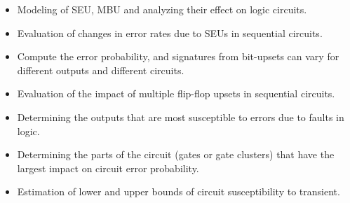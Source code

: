 \begin{itemize}
\item Modeling of SEU, MBU and analyzing their effect on logic circuits.
\item Evaluation of changes in error rates due to SEUs in sequential circuits.
\item Compute the error probability, and signatures from bit-upsets can vary for different outputs and different circuits. 
\item Evaluation of the impact of multiple flip-flop upsets in sequential circuits.
\item Determining the outputs that are most susceptible to errors due to faults in logic.
\item Determining the parts of the circuit (gates or gate clusters) that have the largest impact on circuit error probability.
\item Estimation of lower and upper bounds of circuit susceptibility to transient.
\end{itemize} 
%
%
%
%
%


